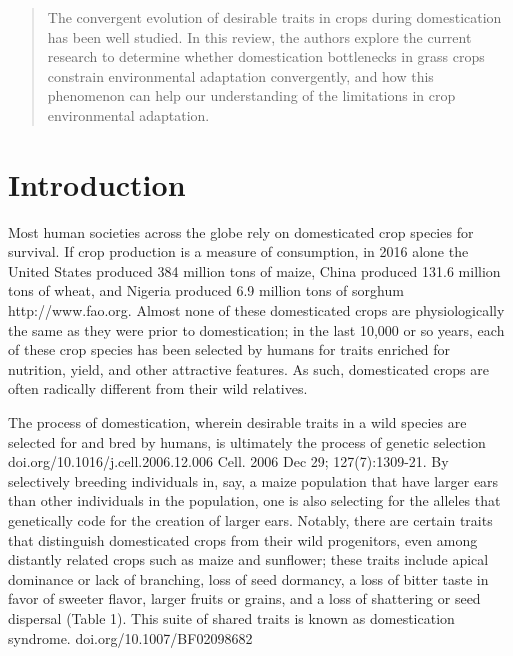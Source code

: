 \documentclass[12pt]{article}
\begin{document}
\maketitle

\begin{abstract}
The convergent evolution of desirable traits in crops during domestication has been well studied. In this review, the authors explore the current research to determine whether domestication bottlenecks in grass crops constrain environmental adaptation convergently, and how this phenomenon can help our understanding of the limitations in crop environmental adaptation.
\end{abstract}

\section{Introduction}
Most human societies across the globe rely on domesticated crop species for survival.  If crop production is a measure of consumption, in 2016 alone the United States produced 384 million tons of maize, China produced 131.6 million tons of wheat, and Nigeria produced 6.9 million tons of sorghum http://www.fao.org. Almost none of these domesticated crops are physiologically the same as they were prior to domestication; in the last 10,000 or so years, each of these crop species has been selected by humans for traits enriched for nutrition, yield, and other attractive features. As such, domesticated crops are often radically different from their wild relatives.

The process of domestication, wherein desirable traits in a wild species are selected for and bred by humans, is ultimately the process of genetic selection doi.org/10.1016/j.cell.2006.12.006  Cell. 2006 Dec 29; 127(7):1309-21. By selectively breeding individuals in, say, a maize population that have larger ears than other individuals in the population, one is also selecting for the alleles that genetically code for the creation of larger ears.  Notably, there are certain traits that distinguish domesticated crops from their wild progenitors, even among distantly related crops such as maize and sunflower; these traits include apical dominance or lack of branching, loss of seed dormancy, a loss of bitter taste in favor of sweeter flavor, larger fruits or grains, and a loss of shattering or seed dispersal (Table 1). This suite of shared traits is known as domestication syndrome. doi.org/10.1007/BF02098682 
\end{document}
